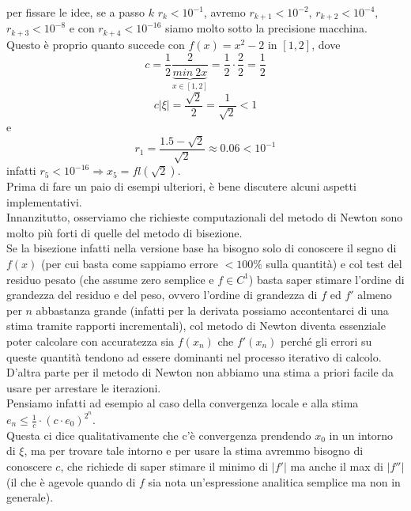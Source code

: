 \documentclass[12pt]{article}
\begin{document}
per fissare le idee, se a passo $k$ $r_k < 10^{-1}$, avremo $r_{k+1} < 10^{-2}$, $r_{k+2} < 10^{-4}$, $r_{k+3} < 10^{-8}$ e con $r_{k+4} < 10^{-16}$ siamo molto sotto la precisione macchina. \\
Questo è proprio quanto succede con $f(x) = x^2 - 2$ in $[1,2]$, dove 
\begin{equation*}
    c = \frac{1}{2}\frac{2}{\underbrace{min \ 2x}_{x \in [1,2]}}  = \frac{1}{2} \cdot \frac{2}{2} = \frac{1}{2}
\end{equation*}
\begin{equation*}
    c|\xi| = \frac{\sqrt{2}}{2} = \frac{1}{\sqrt{2}} < 1
\end{equation*}
e
\begin{equation*}
    r_1 = \frac{1.5 - \sqrt{2}}{\sqrt{2}} \approx 0.06 < 10^{-1}
\end{equation*}
infatti $r_5 < 10^{-16} \Rightarrow x_5 = fl(\sqrt{2})$.\\
Prima di fare un paio di esempi ulteriori, è bene discutere alcuni aspetti implementativi.\\
Innanzitutto, osserviamo che richieste computazionali del metodo di Newton sono molto più forti di quelle del metodo di bisezione.\\
Se la bisezione infatti nella versione base ha bisogno solo di conoscere il segno di $f(x)$ (per cui basta come sappiamo errore $< 100\%$ sulla quantità) e col test del residuo pesato (che assume zero semplice e $f \in C^1$) basta saper stimare l'ordine di grandezza del residuo e del peso, ovvero l'ordine di grandezza di $f$ ed $f'$ almeno per $n$ abbastanza grande (infatti per la derivata possiamo accontentarci di una stima tramite rapporti incrementali), col metodo di Newton diventa essenziale poter calcolare con accuratezza sia $f(x_n)$ che $f'(x_n)$ perché gli errori su queste quantità tendono ad essere dominanti nel processo iterativo di calcolo. D'altra parte per il metodo di Newton non abbiamo una stima a priori facile da usare per arrestare le iterazioni.\\
Pensiamo infatti ad esempio al caso della convergenza locale e alla stima $e_n \leq \frac{1}{c} \cdot (c\cdot e_0)^{2^n}$.\\
Questa ci dice qualitativamente che c'è convergenza prendendo $x_0$ in un intorno di $\xi$, ma per trovare tale intorno e per usare la stima avremmo bisogno di conoscere $c$, che richiede di saper stimare il minimo di $|f'|$ ma anche il max di $|f''|$ (il che è agevole quando di $f$ sia nota un'espressione analitica semplice ma non in generale).\\
\end{document}
